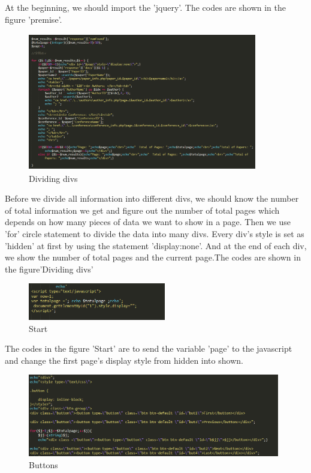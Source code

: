 \documentclass{book}
\begin{document}
At the beginning, we should import the 'jquery'. The codes are shown in the figure 'premise'.


\begin{figure}[H]
\centering
\includegraphics[height=6.0cm,width=10.0cm]{img/dsw_divide.png}
\caption{Dividing divs}
\end{figure}




Before we divide all information into different divs, we should know the number of total information we get and figure out the number of total pages which depends on how many pieces of data we want to show in a page. Then we use 'for' circle statement to divide the data into many divs. Every div's
style is set as 'hidden' at first by using the statement 'display:none'. And at the end of each div, we show the number of total pages and the current page.The codes are shown in the figure'Dividing divs'


\begin{figure}[H]
\centering
\includegraphics[width=6.0cm]{img/dsw_3.png}
\caption{Start}
\end{figure}

The codes in the figure 'Start' are to send the variable 'page' to the javascript and change the first page's display style from hidden into shown.

\begin{figure}[H]
\centering
\includegraphics[width=11.0cm]{img/dsw_button.png}
\caption{Buttons}
\end{figure}
\end{document}
